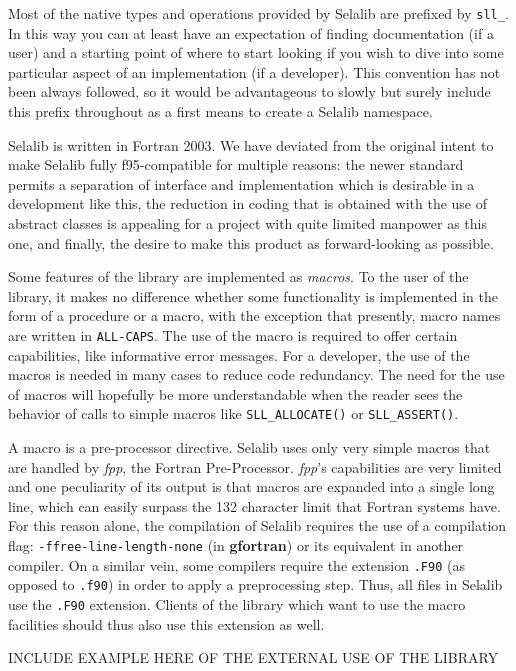 \documentclass[]{report}   %
\begin{document}
Most of the native types and operations provided by Selalib are prefixed by \verb+sll_+. In this way you can at least have an expectation of finding documentation (if a user) and a starting point of where to start looking if you wish to dive into some particular aspect of an implementation (if a developer). This convention has not been always followed, so it would be advantageous to slowly but surely include this prefix throughout as a first means to create a Selalib namespace.

Selalib is written in Fortran 2003. We have deviated from the original intent to make Selalib fully f95-compatible for multiple reasons: the newer standard permits a separation of interface and implementation which is desirable in a development like this, the reduction in coding that is obtained with the use of abstract classes is appealing for a project with quite limited manpower as this one, and finally, the desire to make this product as forward-looking as possible.

Some features of the library are implemented as \emph{macros}. To the user of the library, it makes no difference whether some functionality is implemented in the form of a procedure or a macro, with the exception that presently, macro names are written in \verb+ALL-CAPS+. The use of the macro is required to offer certain capabilities, like informative error messages. For a developer, the use of the macros is needed in many cases to reduce code redundancy. The need for the use of macros will hopefully be more understandable when the reader sees the behavior of calls to simple macros like \verb+SLL_ALLOCATE()+ or \verb+SLL_ASSERT()+.

A macro is a pre-processor directive. Selalib uses only very simple macros that are handled by \emph{fpp}, the Fortran Pre-Processor. \emph{fpp}'s capabilities are very limited and one peculiarity of its output is that macros are expanded into a single long line, which can easily surpass the 132 character limit that Fortran systems have. For this reason alone, the compilation of Selalib requires the use of a compilation flag: \verb+-ffree-line-length-none+ (in \textbf{gfortran}) or its equivalent in another compiler. On a similar vein, some compilers require the extension \verb+.F90+ (as opposed to \verb+.f90+) in order to apply a preprocessing step. Thus, all files in Selalib use the \verb+.F90+ extension. Clients of the library which want to use the macro facilities should thus also use this extension as well.

INCLUDE EXAMPLE HERE OF THE EXTERNAL USE OF THE LIBRARY
\end{document}
